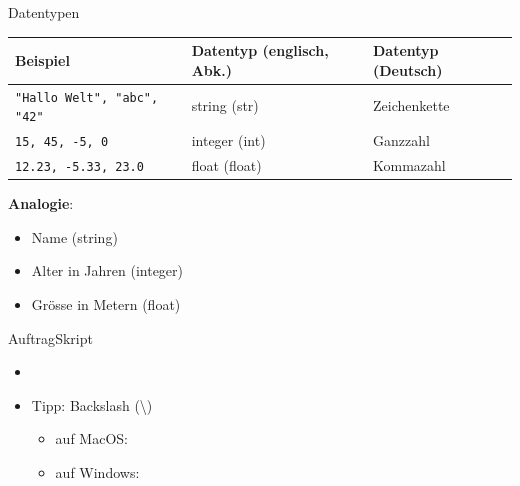 \begin{frame}[fragile]{Datentypen}
	\begin{table}[H]
		\footnotesize
		\centering
		\begin{tabular}{l|p{2cm}|p{2cm}}
			\textbf{Beispiel}                                        & \textbf{Datentyp (englisch, Abk.)} & \textbf{Datentyp (Deutsch)} \\\midrule\midrule
			\lstinline|"Hallo Welt", "abc", "42"| & string (str)                       & Zeichenkette                \\\midrule
			\lstinline|15, 45, -5, 0|             & integer (int)                      & Ganzzahl                    \\\midrule
			\lstinline|12.23, -5.33, 23.0|        & float (float)                      & Kommazahl
		\end{tabular}
	\end{table}

	\textbf{Analogie}:
	\begin{itemize}
		\item Name (string)
		\item Alter in Jahren (integer)
		\item Grösse in Metern (float)
	\end{itemize}
\end{frame}

\begin{frame}[fragile]{Auftrag}{Skript}
	\begin{itemize}
		\item {}
		\item Tipp: Backslash (\textbackslash)
		      \begin{itemize}
			      \item auf MacOS: 
			      \item auf Windows: \keys{\AltGr+\textbackslash}
		      \end{itemize}
	\end{itemize}
\end{frame}
